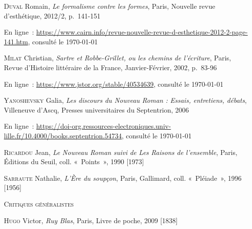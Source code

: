 \documentclass[12pt, a4paper]{article}
\begin{document}
		\textsc{Duval} Romain, \textit{Le formalisme contre les formes}, Paris, Nouvelle revue d’esthétique, 2012/2, p.~141-151
			
			En ligne~: \hyperlink{https://www.cairn.info/revue-nouvelle-revue-d-esthetique-2012-2-page-141.htm}{https://www.cairn.info/revue-nouvelle-revue-d-esthetique-2012-2-page-141.htm}, consulté le \today
		\par
		
		
		
		
	
		\textsc{Milat} Christian, \textit{Sartre et Robbe-Grillet, ou les chemins de l'écriture}, Paris, Revue d'Histoire littéraire de la France, Janvier-Février, 2002, p.~83-96
			
			En ligne~: \hyperlink{https://www.jstor.org/stable/40534639}{https://www.jstor.org/stable/40534639}, consulté le \today
		\par
		
		
		
		
	
		\textsc{Yanoshevsky} Galia, \textit{Les discours du Nouveau Roman : Essais, entretiens, débats}, Villeneuve d'Ascq, Presses universitaires du Septentrion, 2006
			
			En ligne~: \hyperlink{https://doi-org.ressources-electroniques.univ-lille.fr/10.4000/books.septentrion.54734}{https://doi-org.ressources-electroniques.univ-lille.fr/10.4000/books.septentrion.54734}, consulté le \today
		\par 
		 
		
	
		\textsc{Ricardou} Jean, \textit{Le Nouveau Roman suivi de Les Raisons de l'ensemble}, Paris, Éditions du Seuil, coll. «~Points~», 1990 [1973]\par 
		 
		
	
		\textsc{Sarraute} Nathalie, \textit{L'Ère du soupçon}, Paris, Gallimard, coll. «~Pléiade~», 1996 [1956]\par 
		 
		
	
		\vspace*{2cm}
		\setlength{\parindent}{0cm}
{\large\textsc{Critiques généralistes}}
		\vspace*{1cm}
		\setlength{\parindent}{25pt}
		
		
		
		
		\textsc{Hugo} Victor, \textit{Ruy Blas}, Paris, Livre de poche, 2009 [1838]\par 
		 
\end{document}

